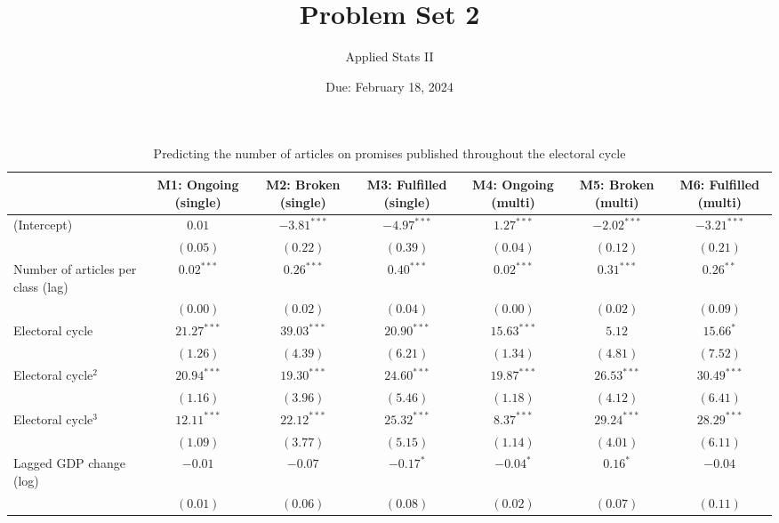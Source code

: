\documentclass[12pt,letterpaper]{article}
\title{Problem Set 2}
\date{Due: February 18, 2024}
\author{Applied Stats II}
\begin{document}
	
\begin{table}[!h]
\caption{Predicting the number of articles on promises published throughout the electoral cycle}
\begin{center}
\begin{scriptsize}
\begin{tabular}{l c c c c c c}
\hline
 & M1: Ongoing (single) & M2: Broken (single) & M3: Fulfilled (single) & M4: Ongoing (multi) & M5: Broken (multi) & M6: Fulfilled (multi) \\
\hline
(Intercept)                        & $0.01$        & $-3.81^{***}$ & $-4.97^{***}$ & $1.27^{***}$  & $-2.02^{***}$ & $-3.21^{***}$ \\
                                   & $(0.05)$      & $(0.22)$      & $(0.39)$      & $(0.04)$      & $(0.12)$      & $(0.21)$      \\
Number of articles per class (lag) & $0.02^{***}$  & $0.26^{***}$  & $0.40^{***}$  & $0.02^{***}$  & $0.31^{***}$  & $0.26^{**}$   \\
                                   & $(0.00)$      & $(0.02)$      & $(0.04)$      & $(0.00)$      & $(0.02)$      & $(0.09)$      \\
Electoral cycle                    & $21.27^{***}$ & $39.03^{***}$ & $20.90^{***}$ & $15.63^{***}$ & $5.12$        & $15.66^{*}$   \\
                                   & $(1.26)$      & $(4.39)$      & $(6.21)$      & $(1.34)$      & $(4.81)$      & $(7.52)$      \\
Electoral cycle$^2$                & $20.94^{***}$ & $19.30^{***}$ & $24.60^{***}$ & $19.87^{***}$ & $26.53^{***}$ & $30.49^{***}$ \\
                                   & $(1.16)$      & $(3.96)$      & $(5.46)$      & $(1.18)$      & $(4.12)$      & $(6.41)$      \\
Electoral cycle$^3$                & $12.11^{***}$ & $22.12^{***}$ & $25.32^{***}$ & $8.37^{***}$  & $29.24^{***}$ & $28.29^{***}$ \\
                                   & $(1.09)$      & $(3.77)$      & $(5.15)$      & $(1.14)$      & $(4.01)$      & $(6.11)$      \\
Lagged GDP change (log)            & $-0.01$       & $-0.07$       & $-0.17^{*}$   & $-0.04^{*}$   & $0.16^{*}$    & $-0.04$       \\
                                   & $(0.01)$      & $(0.06)$      & $(0.08)$      & $(0.02)$      & $(0.07)$      & $(0.11)$      \\

\end{tabular}
\end{scriptsize}
\end{center}
\end{table}
\end{document}
